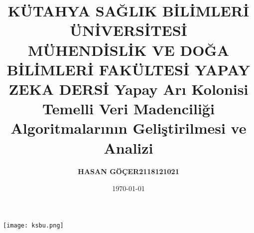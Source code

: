 \documentclass[12pt,a4paper]{article}
\title
{\bf\fontsize{12pt}{14pt}
\selectfont KÜTAHYA SAĞLIK BİLİMLERİ ÜNİVERSİTESİ \\ MÜHENDİSLİK VE DOĞA BİLİMLERİ FAKÜLTESİ}
\date{}
\begin{document}
	
\maketitle

\begin{center}
	\texttt{[image: ksbu.png]}
\end{center}

\begin{center}
	\vspace{1cm} 
\end{center}

\begin{center}
	\title
 {\bf\fontsize{12pt}{14pt}
 \selectfont YAPAY ZEKA DERSİ }
\end{center}

\begin{center}
		\title
  {\bf\fontsize{12pt}{14pt}
  \selectfont Yapay Arı Kolonisi Temelli Veri Madenciliği Algoritmalarının Geliştirilmesi ve Analizi}
\end{center}

\begin{center}
	\vspace{1cm} 
\end{center}

\begin{center}
		
\author
{\bf\fontsize{12pt}{14pt}HASAN GÖÇER\hspace{1.5cm}2118121021}
 
    \begin{center}
	   \vspace{1cm} 
    \end{center}
\date{\today} 
\end{center}
\end{document}
